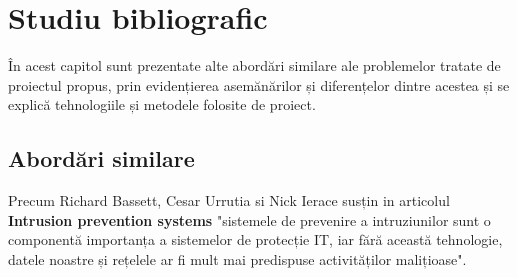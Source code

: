
 \chapter{Studiu bibliografic}
\label{cap:studiu-bibliografic}
%
%
%
În acest capitol sunt prezentate alte abordări similare ale problemelor tratate de proiectul propus, prin evidențierea asemănărilor și diferențelor dintre acestea și se explică tehnologiile și metodele folosite de proiect. 

 \section{Abordări similare}

%
%





Precum Richard Bassett, Cesar Urrutia si 	 Nick Ierace susțin in articolul \textbf{Intrusion prevention systems} \cite{ips}  "sistemele de prevenire a intruziunilor sunt o componentă importanța a sistemelor de protecție IT, iar fără această tehnologie, datele noastre și rețelele ar fi mult mai predispuse activităților malițioase". 

